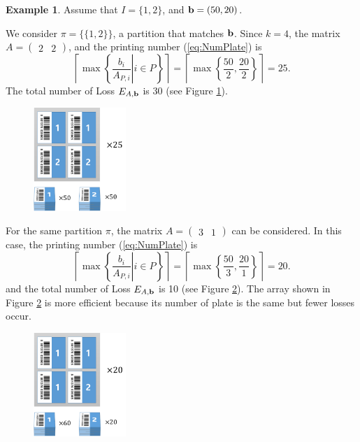 \documentclass[a4paper]{amsart}
\numberwithin{equation}{section} %
\numberwithin{figure}{section} %
\numberwithin{table}{section}
\theoremstyle{plain}
\theoremstyle{definition}
\newtheorem{example}[thm]{Example}
\theoremstyle{plain}
\theoremstyle{plain}
\theoremstyle{plain}
\theoremstyle{plain}
\theoremstyle{plain}
\begin{document}
\begin{example}
	Assume that $I=\{1,2\}$, and ${\bf b}=(50,20)$.
	
	We consider $\pi = \{\{1,2\}\}$, a partition that matches ${\bf b}$. Since $k = 4$, 
	the matrix $A = (\begin{array}{cc}2 & 2\end{array})$, and the printing number (\ref{eq:NumPlate}) is 
	\begin{equation}
	\left\lceil \max\left\{ \left. \frac{b_{i}}{A_{P,i}} \right| i \in P \right\} \right\rceil = \left\lceil \max \left\{ \frac{50}{2}, \frac{20}{2} \right\} \right\rceil = 25.
	\end{equation}
	The total number of Loss $E_{A,{\bf b}}$ is 30 (see Figure \ref{fig:ex21}).
	
	\begin{figure}[h!]
		\centering
		\includegraphics[width=3.5cm]{ex21.pdf}
		\caption{}
		\label{fig:ex21}       %
	\end{figure}
	
	For the same partition $\pi$, the matrix $A = (\begin{array}{cc}3 & 1\end{array})$ can be considered. In this case, the printing number (\ref{eq:NumPlate}) is 
	\begin{equation}
	\left\lceil \max\left\{ \left. \frac{b_{i}}{A_{P,i}} \right| i \in P \right\} \right\rceil = \left\lceil \max \left\{ \frac{50}{3}, \frac{20}{1} \right\} \right\rceil = 20.
	\end{equation}
	and the total number of Loss $E_{A,{\bf b}}$ is 10 (see Figure \ref{fig:ex22}).
	The array shown in Figure \ref{fig:ex22} is more efficient because its number of plate is the same but fewer losses occur.
	\begin{figure}[h!]
		\centering
		\includegraphics[width=3.5cm]{ex22.pdf}
		\caption{}
		\label{fig:ex22}       %
	\end{figure}
\end{example}
\end{document}
